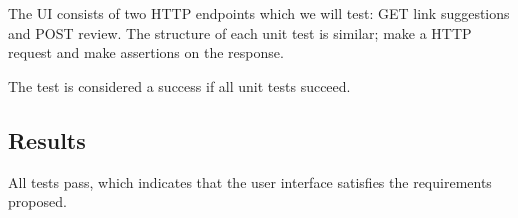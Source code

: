 The UI consists of two HTTP endpoints which we will test: GET link suggestions and POST review. The structure of each unit test is similar; make a HTTP request and make assertions on the response. 

The test is considered a success if all unit tests succeed.

\subsection{Results}
All tests pass, which indicates that the user interface satisfies the requirements proposed. 